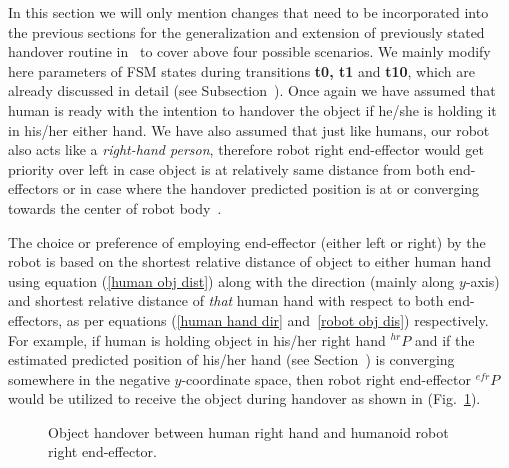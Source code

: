 In this section we will only mention changes that need to be incorporated into the previous sections for the generalization and extension of previously stated handover routine in~ to cover above four possible scenarios. We mainly modify here parameters of FSM states during transitions {\bf t0, t1} and {\bf t10}, which are already discussed in detail (see Subsection~). Once again we have assumed that human is ready with the intention to handover the object if he/she is holding it in his/her either hand. We have also assumed that just like humans, our robot also acts like a \textit{right-hand person}, therefore robot right end-effector would get priority over left in case object is at relatively same distance from both end-effectors or in case where the handover predicted position is at or converging towards the center of robot body~\cite{han2013quantifying}.


The choice or preference of employing end-effector (either left or right) by the robot is based on the shortest relative distance of object to either human hand using equation (\ref{human obj dist}) along with the direction (mainly along $y$-axis) and shortest relative distance of \textit{that} human hand with respect to both end-effectors, as per equations (\ref{human hand dir} and~\ref{robot obj dis}) respectively. For example, if human is holding object in his/her right hand ${}^{hr}{P}$ and if the estimated predicted position of his/her hand (see Section~) is converging somewhere in the negative $y$-coordinate space, then robot right end-effector ${}^{efr}{P}$ would be utilized to receive the object during handover as shown in (Fig.~\ref{fig:hr-to-rr}).


\begin{figure}[hpt]
	\caption{Object handover between human right hand and humanoid robot right end-effector.}
	\label{fig:hr-to-rr}
\end{figure}



